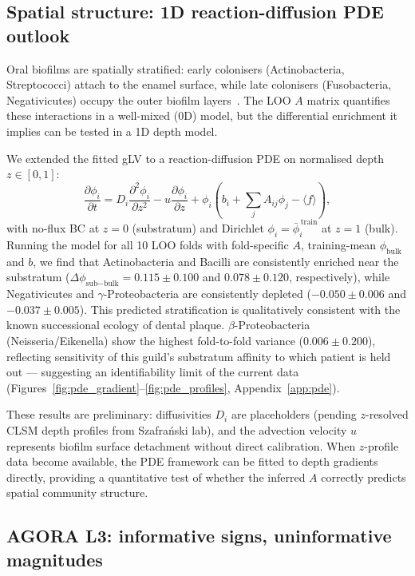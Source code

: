 \documentclass[11pt,a4paper]{article}
\begin{document}
\subsection{Spatial structure: 1D reaction-diffusion PDE outlook}
\label{ssec:disc_pde}

Oral biofilms are spatially stratified: early colonisers (Actinobacteria, Streptococci)
attach to the enamel surface, while late colonisers (Fusobacteria, Negativicutes) occupy
the outer biofilm layers~\citep{kolenbrander2010}.
The LOO $A$ matrix quantifies these interactions in a well-mixed (0D) model, but the
differential enrichment it implies can be tested in a 1D depth model.

We extended the fitted gLV to a reaction-diffusion PDE on normalised depth $z\in[0,1]$:
\begin{equation}
  \frac{\partial\phi_i}{\partial t}
  = D_i\frac{\partial^2\phi_i}{\partial z^2}
  - u\frac{\partial\phi_i}{\partial z}
  + \phi_i\!\left(b_i + \sum_j A_{ij}\phi_j - \langle f\rangle\right),
\end{equation}
with no-flux BC at $z=0$ (substratum) and Dirichlet $\phi_i=\bar\phi^{\,\text{train}}_i$
at $z=1$ (bulk).
Running the model for all 10 LOO folds with fold-specific $A$, training-mean $\phi_{\text{bulk}}$
and $b$, we find that Actinobacteria and Bacilli are consistently enriched near
the substratum ($\Delta\phi_{\text{sub}-\text{bulk}} = 0.115\pm0.100$ and $0.078\pm0.120$,
respectively), while Negativicutes and $\gamma$-Proteobacteria are consistently depleted
($-0.050\pm0.006$ and $-0.037\pm0.005$). This predicted stratification is qualitatively
consistent with the known successional ecology of dental plaque.
$\beta$-Proteobacteria (Neisseria/Eikenella) show the highest fold-to-fold variance
($0.006\pm0.200$), reflecting sensitivity of this guild's substratum affinity to
which patient is held out — suggesting an identifiability limit of the current data
(Figures~\ref{fig:pde_gradient}--\ref{fig:pde_profiles}, Appendix~\ref{app:pde}).

These results are preliminary: diffusivities $D_i$ are placeholders (pending
$z$-resolved CLSM depth profiles from Szafra\'{n}ski lab), and the advection
velocity $u$ represents biofilm surface detachment without direct calibration.
When $z$-profile data become available, the PDE framework can be fitted to depth
gradients directly, providing a quantitative test of whether the inferred $A$
correctly predicts spatial community structure.

\subsection{AGORA L3: informative signs, uninformative magnitudes}
\label{ssec:disc_agora}
\end{document}
